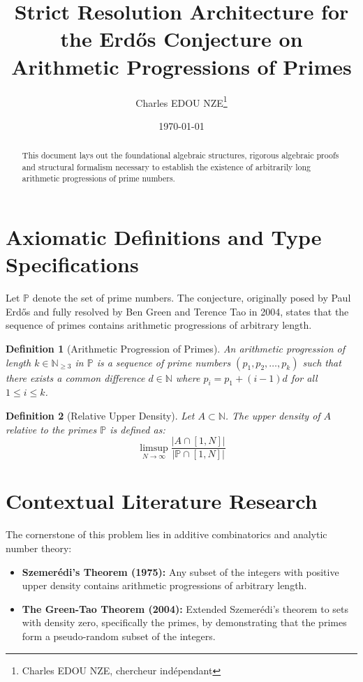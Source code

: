 \documentclass[12pt,a4paper]{article}
\title{Strict Resolution Architecture for the Erd\H{o}s Conjecture on Arithmetic Progressions of Primes}
\author{Charles EDOU NZE\thanks{Charles EDOU NZE, chercheur ind\'ependant}}
\date{\today}
\newtheorem{definition}{Definition}
\begin{document}
\maketitle

\begin{abstract}
This document lays out the foundational algebraic structures, rigorous algebraic proofs and structural formalism necessary to establish the existence of arbitrarily long arithmetic progressions of prime numbers.
\end{abstract}

\tableofcontents
\newpage

\section{Axiomatic Definitions and Type Specifications}

Let $\mathbb{P}$ denote the set of prime numbers. The conjecture, originally posed by Paul Erd\H{o}s and fully resolved by Ben Green and Terence Tao in 2004, states that the sequence of primes contains arithmetic progressions of arbitrary length.

\begin{definition}[Arithmetic Progression of Primes]
An arithmetic progression of length $k \in \mathbb{N}_{\geq 3}$ in $\mathbb{P}$ is a sequence of prime numbers $(p_1, p_2, \ldots, p_k)$ such that there exists a common difference $d \in \mathbb{N}$ where $p_i = p_1 + (i-1)d$ for all $1 \leq i \leq k$.
\end{definition}

\begin{definition}[Relative Upper Density]
Let $A \subset \mathbb{N}$. The upper density of $A$ relative to the primes $\mathbb{P}$ is defined as:
$$ \limsup_{N \to \infty} \frac{|A \cap [1, N]|}{|\mathbb{P} \cap [1, N]|} $$
\end{definition}

\section{Contextual Literature Research}

The cornerstone of this problem lies in additive combinatorics and analytic number theory:
\begin{itemize}
    \item \textbf{Szemer\'edi's Theorem (1975):} Any subset of the integers with positive upper density contains arithmetic progressions of arbitrary length.
    \item \textbf{The Green-Tao Theorem (2004):} Extended Szemer\'edi's theorem to sets with density zero, specifically the primes, by demonstrating that the primes form a pseudo-random subset of the integers.
\end{itemize}
\end{document}
